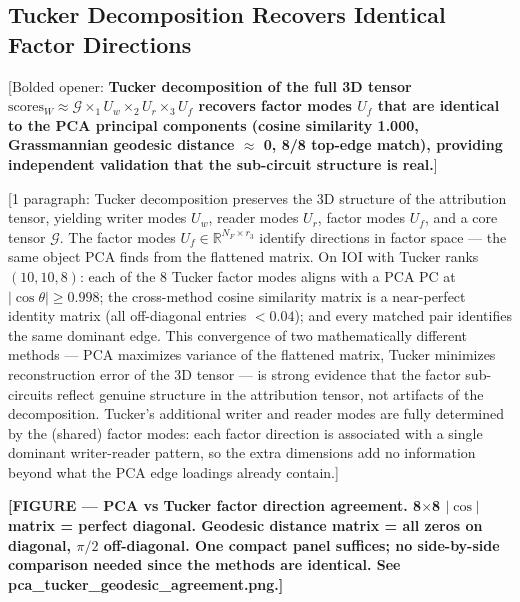 \documentclass[11pt]{article}
\begin{document}
\subsection{Tucker Decomposition Recovers Identical Factor Directions}
\label{sec:tucker_equivalence}

[Bolded opener: \textbf{Tucker decomposition of the full 3D tensor
$\text{scores}_W \approx \mathcal{G} \times_1 U_w \times_2 U_r \times_3 U_f$
recovers factor modes $U_f$ that are identical to the PCA principal
components (cosine similarity 1.000, Grassmannian geodesic distance
$\approx$ 0, 8/8 top-edge match), providing independent validation that
the sub-circuit structure is real.}]

[1 paragraph: Tucker decomposition preserves the 3D structure of the
attribution tensor, yielding writer modes $U_w$, reader modes $U_r$,
factor modes $U_f$, and a core tensor $\mathcal{G}$. The factor modes
$U_f \in \mathbb{R}^{N_F \times r_3}$ identify directions in factor
space --- the same object PCA finds from the flattened matrix. On IOI
with Tucker ranks $(10,10,8)$: each of the 8 Tucker factor modes aligns
with a PCA PC at $|\cos\theta| \geq 0.998$; the cross-method cosine
similarity matrix is a near-perfect identity matrix (all off-diagonal
entries $< 0.04$); and every matched pair identifies the same dominant
edge. This convergence of two mathematically different methods ---
PCA maximizes variance of the flattened matrix, Tucker minimizes
reconstruction error of the 3D tensor --- is strong evidence that the
factor sub-circuits reflect genuine structure in the attribution tensor,
not artifacts of the decomposition. Tucker's additional writer and reader
modes are fully determined by the (shared) factor modes: each factor
direction is associated with a single dominant writer-reader pattern,
so the extra dimensions add no information beyond what the PCA edge
loadings already contain.]

\textbf{[FIGURE --- PCA vs Tucker factor direction agreement.
8$\times$8 $|\cos|$ matrix = perfect diagonal. Geodesic distance
matrix = all zeros on diagonal, $\pi/2$ off-diagonal. One compact
panel suffices; no side-by-side comparison needed since the methods
are identical. See pca\_tucker\_geodesic\_agreement.png.]}
\end{document}
